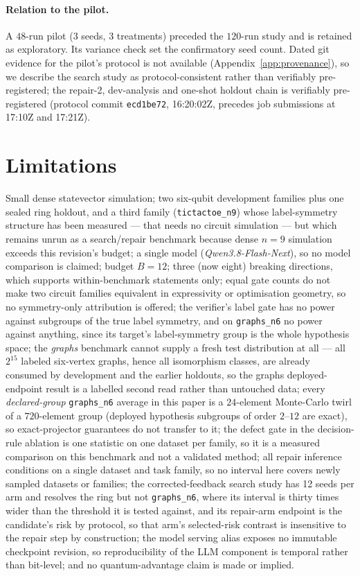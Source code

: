 \documentclass{neurips_2024}
\newcommand{\MODEL}{\textit{Qwen3.8-Flash-Next}}
\begin{document}
\paragraph{Relation to the pilot.} A $48$-run pilot (3 seeds, 3 treatments) preceded the
$120$-run study and is retained as exploratory. Its variance check set the confirmatory
seed count. Dated git evidence for the pilot's protocol is not available
(Appendix~\ref{app:provenance}), so we describe the search study as protocol-consistent
rather than verifiably pre-registered; the repair-2, dev-analysis and one-shot holdout
chain is verifiably pre-registered (protocol commit \texttt{ecd1be72}, 16:20:02Z, precedes
job submissions at 17:10Z and 17:21Z).

\section{Limitations}
\label{sec:limitations}

Small dense statevector simulation; two six-qubit development families plus one sealed
ring holdout, and a third family (\texttt{tictactoe\_n9}) whose label-symmetry structure has
been measured --- that needs no circuit simulation --- but which remains unrun as a
search/repair benchmark because dense $n{=}9$ simulation exceeds this revision's budget; a single model
(\MODEL{}), so no model comparison is claimed; budget $B{=}12$; three (now eight) breaking
directions, which supports within-benchmark statements only; equal gate counts do not make
two circuit families equivalent in expressivity or optimisation geometry, so no
symmetry-only attribution is offered; the verifier's label gate has no power against
subgroups of the true label symmetry, and on \texttt{graphs\_n6} no power against anything,
since its target's label-symmetry group is the whole hypothesis space;
the \emph{graphs} benchmark cannot supply a fresh test distribution at all --- all $2^{15}$
labeled six-vertex graphs, hence all isomorphism classes, are already consumed by
development and the earlier holdouts, so the graphs deployed-endpoint result is a labelled
second read rather than untouched data;
every \emph{declared-group} \texttt{graphs\_n6} average in this paper is a $24$-element
Monte-Carlo twirl of a $720$-element group (deployed hypothesis subgroups of order
$2$--$12$ are exact), so exact-projector guarantees do not transfer to it; the defect gate in
the decision-rule ablation is one statistic on one dataset per family, so it is a measured
comparison on this benchmark and not a validated method;
all repair inference conditions on a single dataset and task family, so no interval here
covers newly sampled datasets or families; the corrected-feedback search study has 12 seeds per
arm and resolves the ring but not \texttt{graphs\_n6}, where its interval is thirty times wider
than the threshold it is tested against, and its repair-arm endpoint is the candidate's risk by
protocol, so that arm's selected-risk contrast is insensitive to the repair step by construction;
the model serving alias exposes no immutable
checkpoint revision, so reproducibility of the LLM component is temporal rather than
bit-level; and no quantum-advantage claim is made or implied.
\end{document}
